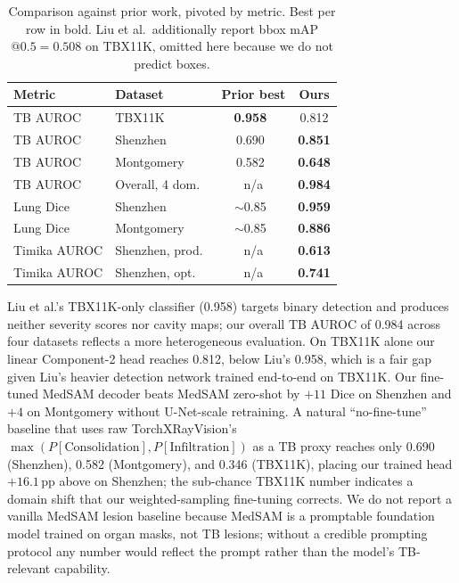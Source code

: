\documentclass{article}
\begin{document}
\begin{table}[!htbp]
\caption{Comparison against prior work, pivoted by metric. Best per row in bold. Liu et al.\ additionally report bbox mAP$@0.5 = 0.508$ on TBX11K, omitted here because we do not predict boxes.}
\label{tab:sota}
\centering
\scriptsize
\setlength{\tabcolsep}{4pt}
\begin{tabular}{llcc}
\toprule
Metric & Dataset & Prior best & Ours \\
\midrule
TB AUROC & TBX11K & \textbf{0.958}~\cite{liu2020tbx11k} & 0.812 \\
TB AUROC & Shenzhen & 0.690~\cite{cohen2022torchxrayvision} & \textbf{0.851} \\
TB AUROC & Montgomery & 0.582~\cite{cohen2022torchxrayvision} & \textbf{0.648} \\
TB AUROC & Overall, 4 dom.\ & n/a & \textbf{0.984} \\
\midrule
Lung Dice & Shenzhen & $\sim$0.85~\cite{ma2024medsam} & \textbf{0.959} \\
Lung Dice & Montgomery & $\sim$0.85~\cite{ma2024medsam} & \textbf{0.886} \\
\midrule
Timika AUROC & Shenzhen, prod.\ & n/a & \textbf{0.613} \\
Timika AUROC & Shenzhen, opt.\ & n/a & \textbf{0.741} \\
\bottomrule
\end{tabular}
\end{table}

Liu et al.'s TBX11K-only classifier (0.958) targets binary detection and produces neither severity scores nor cavity maps; our overall TB AUROC of 0.984 across four datasets reflects a more heterogeneous evaluation. On TBX11K alone our linear Component-2 head reaches 0.812, below Liu's 0.958, which is a fair gap given Liu's heavier detection network trained end-to-end on TBX11K. Our fine-tuned MedSAM decoder beats MedSAM zero-shot by $+11$ Dice on Shenzhen and $+4$ on Montgomery without U-Net-scale retraining. A natural ``no-fine-tune'' baseline that uses raw TorchXRayVision's $\max(P[\text{Consolidation}], P[\text{Infiltration}])$ as a TB proxy reaches only 0.690 (Shenzhen), 0.582 (Montgomery), and 0.346 (TBX11K), placing our trained head $+16.1$\,pp above on Shenzhen; the sub-chance TBX11K number indicates a domain shift that our weighted-sampling fine-tuning corrects. We do not report a vanilla MedSAM lesion baseline because MedSAM is a promptable foundation model trained on organ masks, not TB lesions; without a credible prompting protocol any number would reflect the prompt rather than the model's TB-relevant capability.
\end{document}
